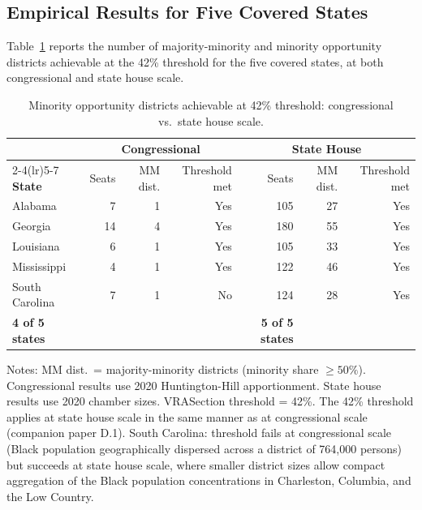 \subsection{Empirical Results for Five Covered States}

Table~\ref{tab:threshold} reports the number of majority-minority and minority opportunity districts achievable at the 42\% threshold for the five covered states, at both congressional and state house scale.

\begin{table}[htbp]
\centering
\caption{Minority opportunity districts achievable at 42\% threshold: congressional vs.\ state house scale.}
\label{tab:threshold}
\begin{threeparttable}
\begin{tabular}{lrrrrrr}
\toprule
 & \multicolumn{3}{c}{\textbf{Congressional}} & \multicolumn{3}{c}{\textbf{State House}} \\
\cmidrule(lr){2-4}\cmidrule(lr){5-7}
\textbf{State} & Seats & MM dist. & Threshold met & Seats & MM dist. & Threshold met \\
\midrule
Alabama       & 7  & 1 & Yes & 105 & 27 & Yes \\
Georgia       & 14 & 4 & Yes & 180 & 55 & Yes \\
Louisiana     & 6  & 1 & Yes & 105 & 33 & Yes \\
Mississippi   & 4  & 1 & Yes & 122 & 46 & Yes \\
South Carolina & 7 & 1 & No  & 124 & 28 & Yes \\
\midrule
\textbf{4 of 5 states} & & & & \textbf{5 of 5 states} & & \\
\bottomrule
\end{tabular}
\begin{tablenotes}
\small
\item Notes: MM dist.\ = majority-minority districts (minority share $\geq 50\%$). Congressional results use 2020 Huntington-Hill apportionment. State house results use 2020 chamber sizes. VRASection threshold = 42\%. The 42\% threshold applies at state house scale in the same manner as at congressional scale (companion paper D.1). South Carolina: threshold fails at congressional scale (Black population geographically dispersed across a district of 764,000 persons) but succeeds at state house scale, where smaller district sizes allow compact aggregation of the Black population concentrations in Charleston, Columbia, and the Low Country.
\end{tablenotes}
\end{threeparttable}
\end{table}


